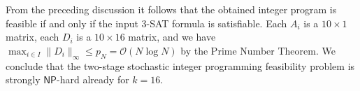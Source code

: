 \documentclass{theoretics}
\renewcommand{\leq}{\leqslant}
\newcommand{\Oh}{{\mathcal{O}}}
\begin{document}
From the preceding discussion it follows that the obtained integer program is feasible if and only if the input 3-SAT formula is satisfiable. Each $A_i$ is a $10 \times 1$ matrix, each $D_i$ is a $10 \times 16$ matrix, and we have $\max_{i\in I} \|D_i\|_\infty \leq p_N = \Oh(N \log N)$ by the Prime Number Theorem. We conclude that the two-stage stochastic integer programming feasibility problem is strongly $\mathsf{NP}$-hard already for $k=16$.
\end{document}
